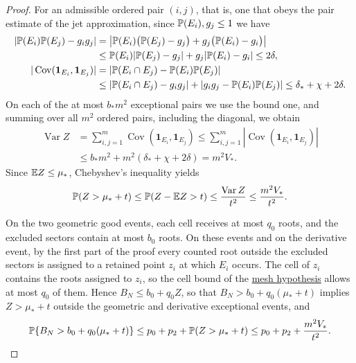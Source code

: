 \begin{proof}
For an admissible ordered pair $(i,j)$, that is, one that obeys the pair
estimate of the jet approximation, since $\mathbb P(E_i),g_j\leq1$ we have
\begin{align*}
 |\mathbb P(E_i)\mathbb P(E_j)-g_ig_j|
 &=\bigl|\mathbb P(E_i)\bigl(\mathbb P(E_j)-g_j\bigr)
       +g_j\bigl(\mathbb P(E_i)-g_i\bigr)\bigr|\\
 &\leq\mathbb P(E_i)|\mathbb P(E_j)-g_j|
       +g_j|\mathbb P(E_i)-g_i|
 \leq2\delta,\\
 |\operatorname{Cov}(\boldsymbol1_{E_i},\boldsymbol1_{E_j})|
 &=|\mathbb P(E_i\cap E_j)-\mathbb P(E_i)\mathbb P(E_j)|\\
 &\leq|\mathbb P(E_i\cap E_j)-g_ig_j|+|g_ig_j-\mathbb P(E_i)\mathbb P(E_j)|
 \leq\delta_*+\chi+2\delta.
\end{align*}
On each of the at most $b_*m^2$ exceptional pairs we use the bound one,
and summing over all $m^2$ ordered pairs, including the diagonal, we
obtain
\begin{align*}
 \operatorname{Var}Z
 &=\sum_{i,j=1}^m
       \operatorname{Cov}(\boldsymbol1_{E_i},\boldsymbol1_{E_j})
 \leq\sum_{i,j=1}^m
       |\operatorname{Cov}(\boldsymbol1_{E_i},\boldsymbol1_{E_j})|\\
 &\leq b_*m^2+m^2(\delta_*+\chi+2\delta)
 =m^2V_*.
\end{align*}
Since $\mathbb E Z\leq\mu_*$, Chebyshev's inequality yields
\[
 \mathbb P(Z>\mu_*+t)
 \leq\mathbb P(Z-\mathbb E Z>t)
 \leq\frac{\operatorname{Var}Z}{t^2}
 \leq\frac{m^2V_*}{t^2}.
\]

On the two geometric good events, each cell receives at most $q_0$
roots, and the excluded sectors contain at most $b_0$ roots. On these
events and on the derivative event, by the first part of the proof every
counted root outside the excluded sectors is assigned to a retained point
$z_i$ at which $E_i$ occurs. The cell of $z_i$ contains the roots
assigned to $z_i$, so the cell bound of the
\hyperref[hyp:mesh]{mesh hypothesis} allows at most $q_0$ of them.
Hence $B_N\leq b_0+q_0Z$, so that
$B_N>b_0+q_0(\mu_*+t)$ implies $Z>\mu_*+t$ outside the geometric and
derivative exceptional events, and
\[
 \mathbb P\{B_N>b_0+q_0(\mu_*+t)\}
 \leq p_0+p_2+\mathbb P(Z>\mu_*+t)
 \leq p_0+p_2+\frac{m^2V_*}{t^2}.
\]
\end{proof}

